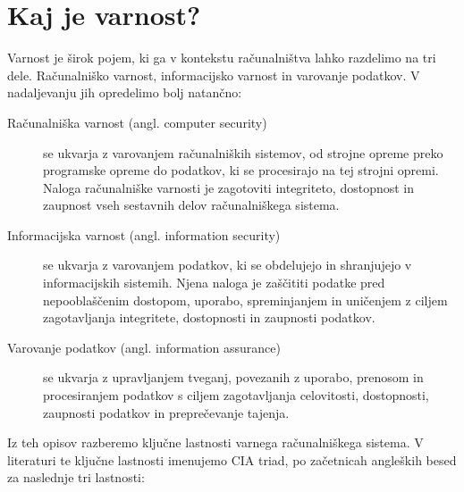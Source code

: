 \documentclass[12pt,a4paper,openany,tikz]{book}
\theoremstyle{plain}
\theoremstyle{definition}
\begin{document}
\section{Kaj je varnost?}
\label{sec:Kaj je varnost?}


Varnost je širok pojem, ki ga v kontekstu računalništva lahko razdelimo na tri dele. Računalniško varnost, informacijsko varnost in varovanje podatkov. V nadaljevanju jih opredelimo bolj natančno:

\begin{description}
	\item[Računalniška varnost (angl. computer security)] se ukvarja z varovanjem računalniških sistemov, od strojne opreme preko programske opreme do podatkov, ki se procesirajo na tej strojni opremi. Naloga računalniške varnosti je zagotoviti integriteto, dostopnost in zaupnost vseh sestavnih delov računalniškega sistema.

  \item[Informacijska varnost (angl. information security)] se ukvarja z varovanjem podatkov, ki se obdelujejo in shranjujejo v informacijskih sistemih. Njena naloga je zaščititi podatke pred nepooblaščenim dostopom, uporabo, spreminjanjem in uničenjem z ciljem zagotavljanja integritete, dostopnosti in zaupnosti podatkov.

  \item[Varovanje podatkov (angl. information assurance)] se ukvarja z upravljanjem tveganj, povezanih z uporabo, prenosom in procesiranjem podatkov s ciljem zagotavljanja celovitosti, dostopnosti, zaupnosti podatkov in preprečevanje tajenja.
\end{description}

\noindent
Iz teh opisov razberemo ključne lastnosti varnega računalniškega sistema. V literaturi te ključne lastnosti imenujemo CIA triad, po začetnicah angleških besed za naslednje tri lastnosti:
\end{document}
